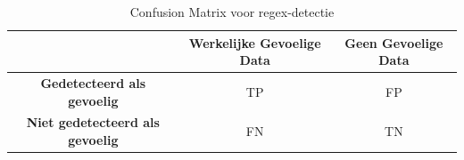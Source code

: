 

\begin{table}[h]
    \centering
    \small
    \scriptsize
    \begin{tabular}{|c|c|c|}
        \hline
        \textbf{} & \textbf{Werkelijke Gevoelige Data} & \textbf{Geen Gevoelige Data} \\ \hline
        \textbf{Gedetecteerd als gevoelig} & TP & FP \\ \hline
        \textbf{Niet gedetecteerd als gevoelig} & FN & TN \\ \hline
    \end{tabular}
    \caption{Confusion Matrix voor regex-detectie}
    \label{tab:confusion_matrix-eigen}
\end{table}

\section{}
\label{sec:performantie-resultaten}







